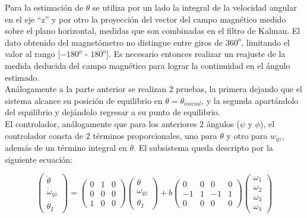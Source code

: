\documentclass[main]{subfiles}
\begin{document}
Para la estimaci\'on de $\theta$ se utiliza por un lado la integral de la velocidad angular en el eje ``z'' y por otro la proyecci\'on del vector del campo magn\'etico medido sobre el plano horizontal, medidas que son combinadas en el filtro de Kalman. El dato obtenido del magnet\'ometro no distingue entre giros de $360^o$, limitando el valor al rango [$-180^o$ - $180^o$]. Es necesario entonces realizar un reajuste de la medida deducida del campo magn\'etico para lograr la continuidad en el \'angulo estimado.\\

Análogamente a la parte anterior se realizan 2 pruebas, la primera dejando que el sistema alcance su posición de equilibrio en $\theta = \theta_{inicial}$, y la segunda apartándolo del equilibrio y dejándolo regresar a su punto de equilibrio.\\

El controlador, análogamente que para los anteriores 2 ángulos ($\psi$ y $\phi$), el controlador consta de 2 términos proporcionales, uno para $\theta$ y otro para $w_{qz}$, además de un término integral en $\theta$. El subsistema queda descripto por la siguiente ecuación:

\begin{equation}
\left(\begin{array}{c}
\dot{\theta}\\
\dot{\omega}_{qz}\\
\dot{\theta_I}
\end{array}\right) = 
\left(\begin{array}{ccc}
0 & 1 & 0\\
0 & 0 & 0\\
1 & 0 & 0
\end{array}\right) 
\left(\begin{array}{c}
{\theta}\\
{\omega}_{qz}\\
{\theta_I}
\end{array}\right)
+ b \left(\begin{array}{cccc}
0  & 0 &  0 & 0 \\
-1 & 1 & -1 & 1 \\
0  & 0 &  0 & 0
\end{array}\right) \left(\begin{array}{c}
\omega_1 \\
\omega_2 \\
\omega_3 \\
\omega_4
\end{array}\right)
\end{equation}
\end{document}
